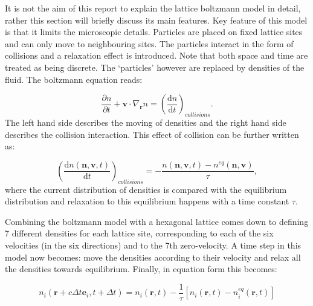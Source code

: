 It is not the aim of this report to explain the lattice boltzmann model in detail, rather this section will briefly discuss its main features. Key feature of this model is that it limits the microscopic details. Particles are placed on fixed lattice sites and can only move to neighbouring sites. The particles interact in the form of collisions and a relaxation effect is introduced. Note that both space and time are treated as being discrete. The `particles' however are replaced by densities of the fluid. The boltzmann equation reads:

\begin{equation}
    \frac{\partial n}{\partial t} + \mathbf{v} \cdot \nabla_{\mathbf{r}} n = \left( \frac{\mathrm{d}n}{\mathrm{d}t} \right )_{collisions}.
\end{equation}
The left hand side describes the moving of densities and the right hand side describes the collision interaction. This effect of collision can be further written as:

\begin{equation}
    \left( \frac{\mathrm{d}n \left( \mathbf{n}, \mathbf{v}, t \right ) }{\mathrm{d}t} \right )_{collisions} = - \frac{n \left( \mathbf{n}, \mathbf{v}, t \right ) - n^{eq} \left( \mathbf{n}, \mathbf{v} \right ) }{\tau},
\end{equation}
where the current distribution of densities is compared with the equilibrium distribution and relaxation to this equilibrium happens with a time constant $\tau$.

Combining the boltzmann model with a hexagonal lattice comes down to defining 7 different densities for each lattice site, corresponding to each of the six velocities (in the six directions) and to the 7th zero-velocity. A time step in this model now becomes: move the densities according to their velocity and relax all the densities towards equilibrium. Finally, in equation form this becomes:

\begin{equation}
    n_i \left( \mathbf{r} + c\Delta t \mathbf{e}_i, t+ \Delta t \right) = n_i \left( \mathbf{r}, t \right ) - \frac{1}{\tau} \left[ n_i \left( \mathbf{r},t \right) - n_i^{eq} \left( \mathbf{r},t \right ) \right ]
\end{equation}